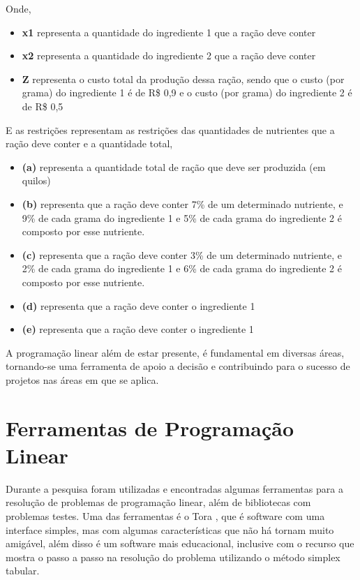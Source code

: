 Onde, 
\begin{itemize}
\item \textbf {x1} representa a quantidade do ingrediente 1 que a ração deve conter
\item \textbf {x2} representa a quantidade do ingrediente 2 que a ração deve conter
\item \textbf {Z} representa o custo total da produção dessa ração, sendo que o custo (por grama) do ingrediente 1 é de R\$ 0,9 e o custo (por grama) do ingrediente 2 é de R\$ 0,5
\end{itemize}

E as restrições representam as restrições das quantidades de nutrientes que a ração deve conter e a quantidade total,
\begin{itemize}
\item \textbf {(a)} representa a quantidade total de ração que deve ser produzida (em quilos)
\item \textbf {(b)} representa que a ração deve conter 7\% de um determinado nutriente, e 9\% de cada grama do ingrediente 1 e 5\% de cada grama do ingrediente 2 é composto por esse nutriente. 
\item \textbf {(c)} representa que a ração deve conter 3\% de um determinado nutriente, e 2\% de cada grama do ingrediente 1 e 6\% de cada grama do ingrediente 2 é composto por esse nutriente.
\item \textbf {(d)} representa que a ração deve conter o ingrediente 1
\item \textbf {(e)} representa que a ração deve conter o ingrediente 1
\end{itemize}

A programação linear além de estar presente, é fundamental em diversas áreas, tornando-se uma ferramenta de apoio a decisão e contribuindo para o sucesso de projetos nas áreas em que se aplica.

\section{Ferramentas de Programação Linear}
Durante a pesquisa foram utilizadas e encontradas algumas ferramentas para a resolução de problemas de programação linear, além de bibliotecas com problemas testes. 
Uma das ferramentas é o Tora \cite{Taha}, que é software com uma interface simples, mas com algumas características que não há tornam muito amigável, além disso é um software mais educacional, inclusive com o recurso que mostra o passo a passo na resolução do problema utilizando o método simplex tabular.

